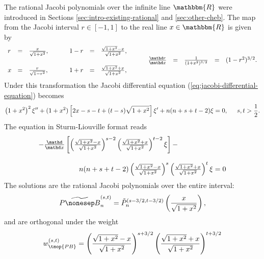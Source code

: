 \label{app:odes-rat-pb}The rational Jacobi polynomials over the infinite line
$\mathbbm{R}$ were introduced in Sections \ref{sec:intro-existing-rational}
and \ref{sec:other-cheb}. The map from the Jacobi interval $r \in [- 1, 1]$ to
the real line $x \in \mathbbm{R}$ is given by
\[ \begin{array}{lllllllllllll}
     r & = & \frac{x}{\sqrt{1 + x^2}}, &  & 1 - r & = & \frac{\sqrt{1 + x^2} -
     x}{\sqrt{1 + x^2}}, &  &  &  &  &  & \\
     &  &  &  &  &  &  & \hspace{0.5cm}  & \frac{\mathd r}{\mathd x} & = &
     \frac{1}{(1 + x^2)^{3 / 2}} & = & (1 - r^2)^{3 / 2} .\\
     x & = & \frac{r}{\sqrt{1 - r^2}}, & \hspace{0.5cm}  & 1 + r & = &
     \frac{\sqrt{1 + x^2} + x}{\sqrt{1 + x^2}}, &  &  &  &  &  & 
   \end{array} \]
Under this transformation the Jacobi differential equation
(\ref{eq:jacobi-differential-equation}) becomes
\[ \left( 1 + x^2 \right)^2 \xi'' + (1 + x^2) \left[ 2 x - s - t + (t - s)
   \sqrt{1 + x^2} \right] \xi' + n (n + s + t - 2) \xi = 0, \hspace{0.5cm} s,
   t > \frac{1}{2} . \]
The equation in Sturm-Liouville format reads
\[ \begin{array}{l}
     - \frac{\mathd}{\mathd x} \left[ \left( \frac{\sqrt{1 + x^2} - x}{\sqrt{1
     + x^2}} \right)^{s - 2} \left( \frac{\sqrt{1 + x^2} + x}{\sqrt{1 + x^2}}
     \right)^{t - 2} \xi \right] -\\
     \\
     \hspace{2cm} n (n + s + t - 2) \left( \frac{\sqrt{1 + x^2} - x}{\sqrt{1 +
     x^2}} \right)^s \left( \frac{\sqrt{1 + x^2} + x}{\sqrt{1 + x^2}}
     \right)^t \xi = 0
   \end{array} \]
The solutions are the rational Jacobi polynomials over the entire interval:
\[ \widetilde{P \nonesep B}_n^{(s, t)} = \tilde{P}^{(s - 3 / 2, t - 3 / 2)}_n
   \left( \frac{x}{\sqrt{1 + x^2}} \right), \]
and are orthogonal under the weight
\[ w_{\tmop{PB}}^{(s, t)} = \left( \frac{\sqrt{1 + x^2} - x}{\sqrt{1 + x^2}}
   \right)^{s + 3 / 2} \left( \frac{\sqrt{1 + x^2} + x}{\sqrt{1 + x^2}}
   \right)^{t + 3 / 2} \]
